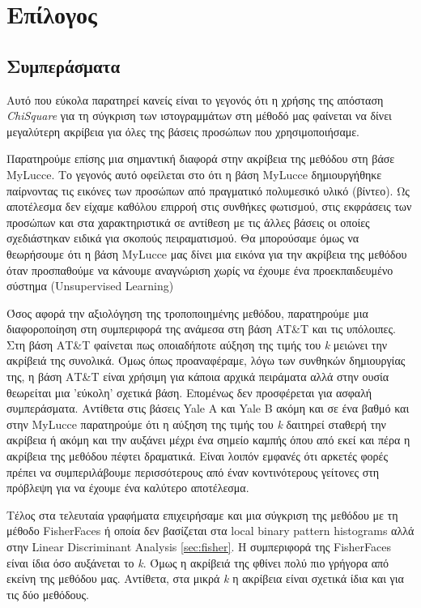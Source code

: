 \chapter{Επίλογος}\label{ch:conclusion}

\section{Συμπεράσματα}\label{sec:remarks}

Αυτό που εύκολα παρατηρεί κανείς είναι το γεγονός ότι η χρήσης της  απόσταση
\emph{ChiSquare} για τη σύγκριση των ιστογραμμάτων στη μέθοδό μας φαίνεται να
δίνει μεγαλύτερη ακρίβεια για όλες της βάσεις προσώπων που χρησιμοποιήσαμε.

Παρατηρούμε επίσης μια σημαντική διαφορά στην ακρίβεια της μεθόδου στη βάσε MyLucce.
Το γεγονός αυτό οφείλεται στο ότι η βάση MyLucce δημιουργήθηκε παίρνοντας τις εικόνες
των προσώπων από πραγματικό πολυμεσικό υλικό (βίντεο). Ως αποτέλεσμα δεν είχαμε καθόλου
επιρροή στις συνθήκες φωτισμού, στις εκφράσεις των προσώπων και στα χαρακτηριστικά
σε αντίθεση με τις άλλες βάσεις οι οποίες σχεδιάστηκαν ειδικά για σκοπούς πειραματισμού.
Θα μπορούσαμε όμως να θεωρήσουμε ότι η βάση MyLucce μας δίνει μια εικόνα για την
ακρίβεια της μεθόδου όταν προσπαθούμε να κάνουμε αναγνώριση χωρίς να έχουμε ένα
προεκπαιδευμένο σύστημα (Unsupervised Learning)

Όσος αφορά την αξιολόγηση της τροποποιημένης μεθόδου, παρατηρούμε μια διαφοροποίηση
στη συμπεριφορά της ανάμεσα στη βάση AT\&Τ και τις υπόλοιπες. Στη βάση ΑΤ\&Τ φαίνεται
πως οποιαδήποτε αύξηση της τιμής του \emph{k} μειώνει την ακρίβειά της συνολικά.
Όμως όπως προαναφέραμε, λόγω των συνθηκών δημιουργίας της, η βάση ΑΤ\&Τ είναι
χρήσιμη για κάποια αρχικά πειράματα αλλά στην ουσία θεωρείται μια 'εύκολη' σχετικά
βάση. Επομένως δεν προσφέρεται για ασφαλή συμπεράσματα. Αντίθετα στις βάσεις Yale A
και Yale B ακόμη και σε ένα βαθμό και στην MyLucce παρατηρούμε ότι η αύξηση της τιμής
του \emph{k} δαιτηρεί σταθερή την ακρίβεια ή ακόμη και την αυξάνει μέχρι ένα σημείο
καμπής όπου από εκεί και πέρα η ακρίβεια της μεθόδου πέφτει δραματικά. Είναι λοιπόν
εμφανές ότι αρκετές φορές πρέπει να συμπεριλάβουμε περισσότερους από έναν κοντινότερους
γείτονες στη πρόβλεψη για να έχουμε ένα καλύτερο αποτέλεσμα.

Τέλος στα τελευταία γραφήματα επιχειρήσαμε και μια σύγκριση της μεθόδου με τη μέθοδο
FisherFaces ή οποία δεν βασίζεται στα local binary pattern histograms αλλά στην
Linear Discriminant Analysis \ref{sec:fisher}.
Η συμπεριφορά της FisherFaces είναι ίδια όσο αυξάνεται το \emph{k}. Όμως η ακρίβειά
της φθίνει πολύ πιο γρήγορα από εκείνη της μεθόδου μας. Αντίθετα,  στα μικρά \emph{k} η
ακρίβεια είναι σχετικά ίδια και για τις δύο μεθόδους.


